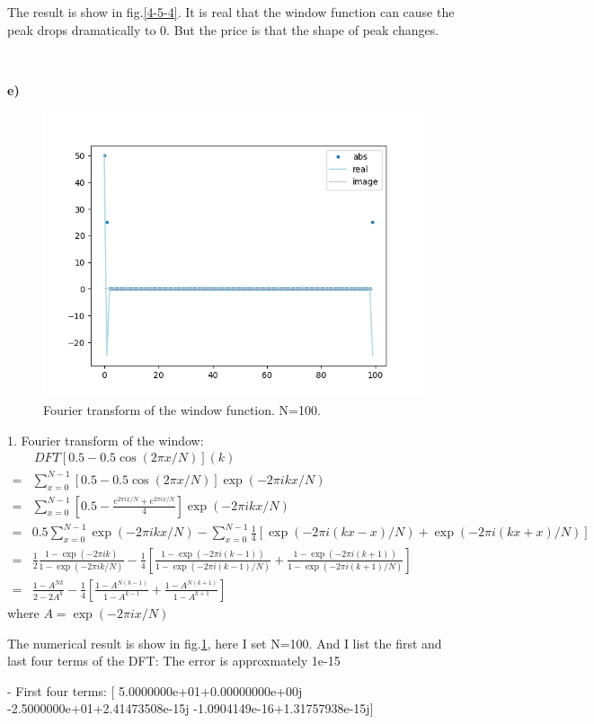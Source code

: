\documentclass[showpacs, oneside, onecolumn, prl, amsmath, amssymb, nofootinbib, superscriptaddress, notitlepage]{revtex4-1}
\newcommand\bas{\begin{align*}}
\newcommand\bfig{\begin{figure}}
\newcommand\efig{\end{figure}}
\begin{document}
The result is show in fig.\ref{4-5-4}. It is real that the window function can cause the peak drops dramatically to 0. But the price is that the shape of peak changes.

~~~~

\textbf{e)}

\bfig
	\centering
	\includegraphics[scale=0.85]{4-5-5-1.png}
	\caption{Fourier transform of the window function. N=100.}
	\label{4-5-5-1}
\efig

1. Fourier transform of the window: 
\bas
&\,DFT[0.5-0.5\cos(2\pi x/N)](k)\\
=&\sum_{x=0}^{N-1}[0.5-0.5\cos(2\pi x/N)]\exp(-2\pi ikx/N)\\
=&\sum_{x=0}^{N-1}\left[0.5-\frac{e^{2\pi ix/N}+e^{2\pi ix/N}}{4}\right]\exp(-2\pi ikx/N)\\
=&0.5\sum_{x=0}^{N-1}\exp(-2\pi ikx/N)-\sum_{x=0}^{N-1}\frac14[\exp(-2\pi i(kx-x)/N)+\exp(-2\pi i(kx+x)/N)]\\
=&\frac12\frac{1-\exp(-2\pi ik)}{1-\exp(-2\pi ik/N)}-\frac1{4}\left[\frac{1-\exp(-2\pi i(k-1))}{1-\exp(-2\pi i(k-1)/N)}+\frac{1-\exp(-2\pi i(k+1))}{1-\exp(-2\pi i(k+1)/N)}\right]\\
=&\frac{1-A^{Nk}}{2-2A^{k}}-\frac14\left[\frac{1-A^{N(k-1)}}{1-A^{k-1}}+\frac{1-A^{N(k+1)}}{1-A^{k+1}}\right]
\end{align*}
where $A=\exp(-2\pi ix/N)$

The numerical result is show in fig.\ref{4-5-5-1}, here I set N=100. And I list the first and last four terms of the DFT: The error is approxmately 1e-15

- First four terms: [ 5.0000000e+01+0.00000000e+00j -2.5000000e+01+2.41473508e-15j
 -1.0904149e-16+1.31757938e-15j]
\end{document}
